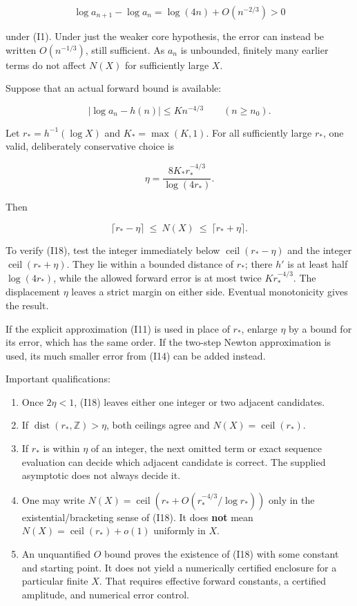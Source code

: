\documentclass[11pt,letterpaper]{article}
\numberwithin{equation}{section}
\theoremstyle{remark}
\providecommand{\tightlist}{\setlength{\itemsep}{0pt}\setlength{\parskip}{0pt}}
\begin{document}
\[
\log a_{n+1}-\log a_n=\log(4n)+O(n^{-2/3})>0
\]

under (I1). Under just the weaker core hypothesis, the error can instead be written \(O(n^{-1/3})\), still sufficient. As \(a_n\) is unbounded, finitely many earlier terms do not affect \(N(X)\) for sufficiently large \(X\).

Suppose that an actual forward bound is available:

\[
|\log a_n-h(n)|\le K n^{-4/3}\qquad(n\ge n_0).
\tag{I17}
\]

Let \(r_*=h^{-1}(\log X)\) and \(K_*=\max(K,1)\). For all sufficiently large \(r_*\), one valid, deliberately conservative choice is

\[
\eta=\frac{8K_* r_*^{-4/3}}{\log(4r_*)}.
\]

Then

\[
\boxed{\quad
\lceil r_*-\eta\rceil\ \le\ N(X)\ \le\ \lceil r_*+\eta\rceil.
\quad}
\tag{I18}
\]

To verify (I18), test the integer immediately below \(\operatorname{ceil}(r_*-\eta)\) and the integer \(\operatorname{ceil}(r_*+\eta)\). They lie within a bounded distance of \(r_*\); there \(h'\) is at least half \(\log(4r_*)\), while the allowed forward error is at most twice \(K r_*^{-4/3}\). The displacement \(\eta\) leaves a strict margin on either side. Eventual monotonicity gives the result.

If the explicit approximation (I11) is used in place of \(r_*\), enlarge \(\eta\) by a bound for its error, which has the same order. If the two-step Newton approximation is used, its much smaller error from (I14) can be added instead.

Important qualifications:

\begin{enumerate}
\def\labelenumi{\arabic{enumi}.}
\tightlist
\item
  Once \(2 \eta<1\), (I18) leaves either one integer or two adjacent candidates.
\item
  If \(\operatorname{dist}(r_*,\mathbb Z)>\eta\), both ceilings agree and \(N(X)=\operatorname{ceil}(r_*)\).
\item
  If \(r_*\) is within \(\eta\) of an integer, the next omitted term or exact sequence evaluation can decide which adjacent candidate is correct. The supplied asymptotic does not always decide it.
\item
  One may write \(N(X)=\operatorname{ceil}(r_*+O(r_*^{-4/3}/\log r_*))\) only in the existential/bracketing sense of (I18). It does \textbf{not} mean \(N(X)=\operatorname{ceil}(r_*)+o(1)\) uniformly in \(X\).
\item
  An unquantified \(O\) bound proves the existence of (I18) with some constant and starting point. It does not yield a numerically certified enclosure for a particular finite \(X\). That requires effective forward constants, a certified amplitude, and numerical error control.
\end{enumerate}
\end{document}
